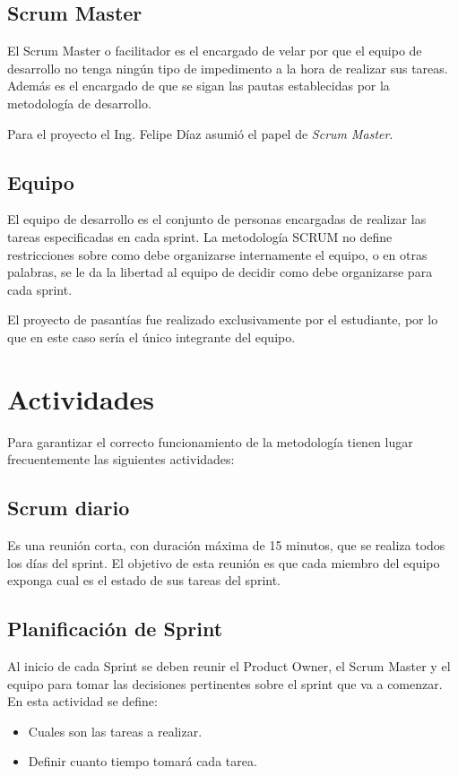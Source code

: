 \subsection{Scrum Master}
El Scrum Master o facilitador es el encargado de velar por que el equipo de
desarrollo no tenga ningún tipo de impedimento a la hora de realizar sus tareas.
Además es el encargado de que se sigan las pautas establecidas por la metodología
de desarrollo.

Para el proyecto el Ing. Felipe Díaz asumió el papel de \emph{Scrum Master}.

\subsection{Equipo}

El equipo de desarrollo es el conjunto de personas encargadas de realizar las tareas
especificadas en cada sprint. La metodología SCRUM no define restricciones sobre como
debe organizarse internamente el equipo, o en otras palabras, se le da la libertad al
equipo de decidir como debe organizarse para cada sprint.

El proyecto de pasantías fue realizado exclusivamente por el estudiante, por lo que
en este caso sería el único integrante del equipo.


\section{Actividades}

Para garantizar el correcto funcionamiento de la metodología tienen lugar frecuentemente
las siguientes actividades:

\subsection{Scrum diario}
Es una reunión corta, con duración máxima de 15 minutos, que se realiza todos los días
del sprint. El objetivo de esta reunión es que cada miembro del equipo exponga cual
es el estado de sus tareas del sprint.

\subsection{Planificación de Sprint}
Al inicio de cada Sprint se deben reunir el Product Owner, el Scrum Master y el equipo
para tomar las decisiones pertinentes sobre el sprint que va a comenzar. En esta actividad
se define:

\begin{itemize}
  \item Cuales son las tareas a realizar.
  \item Definir cuanto tiempo tomará cada tarea.
\end{itemize}

